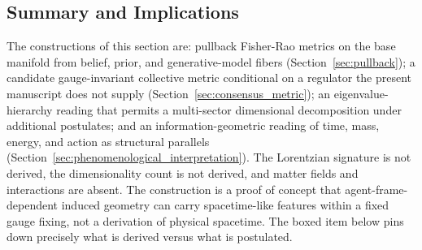 \documentclass[11pt]{article}
\begin{document}
\subsection{Summary and Implications}

The constructions of this section are: pullback Fisher-Rao metrics on the base manifold from belief, prior, and generative-model fibers (Section~\ref{sec:pullback}); a candidate gauge-invariant collective metric conditional on a regulator the present manuscript does not supply (Section~\ref{sec:consensus_metric}); an eigenvalue-hierarchy reading that permits a multi-sector dimensional decomposition under additional postulates; and an information-geometric reading of time, mass, energy, and action as structural parallels (Section~\ref{sec:phenomenological_interpretation}). The Lorentzian signature is not derived, the dimensionality count is not derived, and matter fields and interactions are absent. The construction is a proof of concept that agent-frame-dependent induced geometry can carry spacetime-like features within a fixed gauge fixing, not a derivation of physical spacetime. The boxed item below pins down precisely what is derived versus what is postulated.
\end{document}
